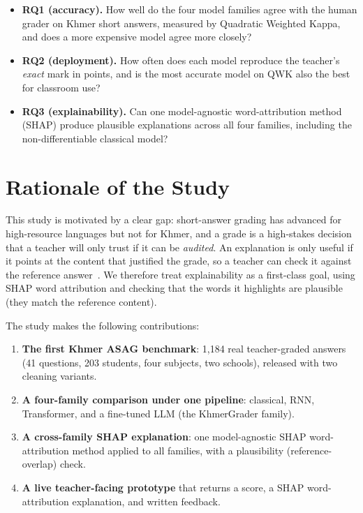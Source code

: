 \begin{itemize}[leftmargin=1.4em]
  \item \textbf{RQ1 (accuracy).} How well do the four model families agree with the human grader on
  Khmer short answers, measured by Quadratic Weighted Kappa, and does a more expensive model agree
  more closely?
  \item \textbf{RQ2 (deployment).} How often does each model reproduce the teacher's \emph{exact} mark
  in points, and is the most accurate model on QWK also the best for classroom use?
  \item \textbf{RQ3 (explainability).} Can one model-agnostic word-attribution method (SHAP) produce
  plausible explanations across all four families, including the non-differentiable classical model?
\end{itemize}

\section{Rationale of the Study}
This study is motivated by a clear gap: short-answer grading has advanced for high-resource languages
but not for Khmer, and a grade is a high-stakes decision that a teacher will only trust if it can be
\emph{audited}. An explanation is only useful if it points at the content that justified the grade, so
a teacher can check it against the reference answer~\citep{lyu2024faithfulsurvey}. We therefore treat
explainability as a first-class goal, using SHAP word attribution and checking that the words it
highlights are plausible (they match the reference content).

The study makes the following contributions:

\begin{enumerate}[leftmargin=1.8em]
  \item \textbf{The first Khmer ASAG benchmark}: 1{,}184 real teacher-graded answers (41 questions,
  203 students, four subjects, two schools), released with two cleaning variants.
  \item \textbf{A four-family comparison under one pipeline}: classical, RNN, Transformer, and a
  fine-tuned LLM (the KhmerGrader family).
  \item \textbf{A cross-family SHAP explanation}: one model-agnostic SHAP word-attribution method
  applied to all families, with a plausibility (reference-overlap) check.
  \item \textbf{A live teacher-facing prototype} that returns a score, a SHAP word-attribution
  explanation, and written feedback.
\end{enumerate}

